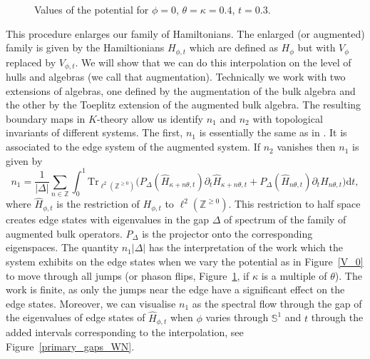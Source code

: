 \documentclass[11pt]{amsart}
\newcommand{\Z}{\mathbb{Z}}
\newcommand{\cut}{\kappa}
\begin{document}
\begin{figure}
	\caption{Values of the potential for  $\phi=0$, $\theta=\cut=0.4$, $t=0.3$.}\label{V_0b}
\end{figure}
This procedure enlarges our family of Hamiltonians. The enlarged (or augmented) family is given by the Hamiltionians  
$H_{\phi,t}$ which are defined as  
$ H_{\phi}$ but with $V_\phi$ replaced by $V_{\phi,t}$.
We will show that we can do this interpolation on the level of hulls and algebras (we call that augmentation). 
Technically we work with two extensions of algebras, one defined by the augmentation of the bulk algebra and the other by the Toeplitz extension of the augmented bulk algebra. The resulting boundary maps in $K$-theory allow us identify $n_1$ and $n_2$ with topological invariants of different systems. The first, $n_1$ is essentially the same as in \cite{kellendonk_prodan}. It is associated to the edge system of the augmented system. If $n_2$ vanishes then $n_1$ is given by
\begin{equation}\label{eq-n1}
	n_1=\frac1{|\Delta|} \sum_{n\in\Z} \int_0^1 {\mathrm{Tr_{\ell^2(\Z^{\geq 0})}}}\big( 
	P_{\Delta}(\hat H_{\cut+n\theta,t})\partial_t\hat H_{\cut+n\theta,t}
	+P_{\Delta}(\hat H_{n\theta,t})\partial_t \hat H_{n\theta,t}\big)
	\text{d}t,
\end{equation}
where $\hat H_{\phi,t}$ is the restriction of $H_{\phi,t}$ to $\ell^2(\Z^{\geq 0})$. This restriction to half space creates edge states with eigenvalues  in the gap $\Delta$ of spectrum of the family of augmented bulk operators. 
$P_\Delta$ is the projector onto the corresponding eigenspaces.
The quantity $n_1|\Delta|$ has the interpretation of the work which the system exhibits on the edge states when we vary the potential as in Figure~\ref{V_0} to move through all jumps (or phason flips, Figure~\ref{V_0b}, if $\kappa$ is a multiple of $\theta$). The work is finite, as only the jumps near the edge have a significant effect on the edge states. Moreover, we can visualise $n_1$
as the spectral flow through the gap of the eigenvalues of edge states of $\hat H_{\phi,t}$ when $\phi$ varies through $\mathbb S^1$ and $t$ through the added intervals corresponding to the interpolation, see Figure~\ref{primary_gaps_WN}. 
\end{document}

